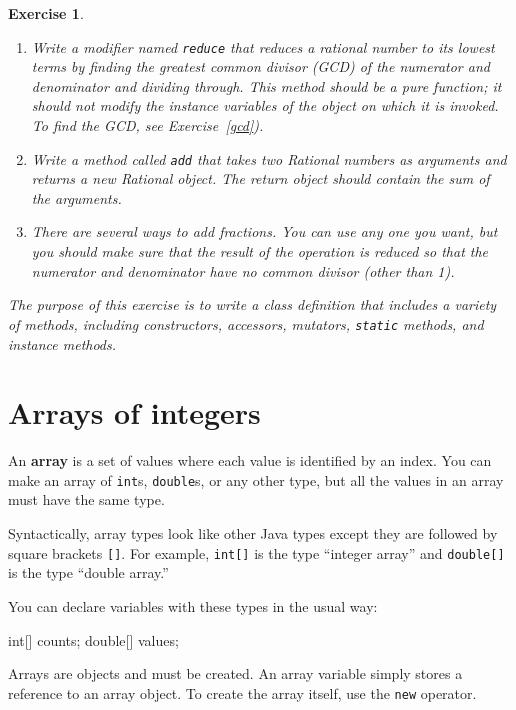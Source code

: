 \documentclass[12pt]{book}
\theoremstyle{exercise}
\newtheorem{exercise}{Exercise}[chapter]
\newcommand{\java}[1]{\verb"#1"}
\newcommand{\java}[1]{\lstinline{#1}} %
\begin{document}
\begin{exercise}
\begin{enumerate}
\item Write a modifier named \java{reduce} that reduces a rational number to its lowest terms by finding the greatest common divisor (GCD) of the numerator and denominator and dividing through.
This method should be a pure function; it should not modify the instance variables of the object on which it is invoked.
To find the GCD, see Exercise~\ref{gcd}).

\item Write a method called \java{add} that takes two Rational numbers as arguments and returns a new Rational object.
The return object should contain the sum of the arguments.

\item There are several ways to add fractions.
You can use any one you want, but you should make sure that the result of the operation is reduced so that the numerator and denominator have no common divisor (other than 1).
\end{enumerate}

The purpose of this exercise is to write a class definition that includes a variety of methods, including constructors, accessors, mutators, \java{static} methods, and instance methods.
\end{exercise}


\chapter{Arrays of integers}
\label{arrays}


An {\bf array} is a set of values where each value is identified by an index.
You can make an array of \java{int}s, \java{double}s, or any other type, but all the values in an array must have the same type.

Syntactically, array types look like other Java types except they are followed by square brackets \java{[]}.
For example, \java{int[]} is the type ``integer array'' and \java{double[]} is the type ``double array.''

You can declare variables with these types in the usual way:

\begin{code}
    int[] counts;
    double[] values;
\end{code}

Arrays are objects and must be created.
An array variable simply stores a reference to an array object.
To create the array itself, use the \java{new} operator.
\end{document}
